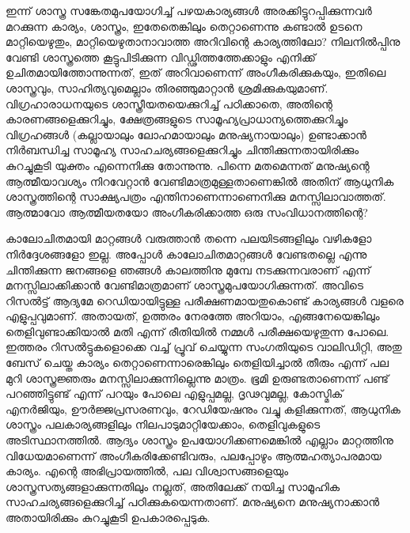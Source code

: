 ഇന്ന് ശാസ്ത്ര സങ്കേതമുപയോഗിച്ച് പഴയകാര്യങ്ങള്‍ അരക്കിട്ടുറപ്പിക്കുന്നവര്‍ മറക്കുന്ന കാര്യം, ശാസ്ത്രം, ഇതേതെങ്കിലും തെറ്റാണെന്നു കണ്ടാല്‍ ഉടനെ മാറ്റിയെഴുതും, മാറ്റിയെഴുതാനാവാത്ത അറിവിന്റെ കാര്യത്തിലോ? നിലനില്‍പ്പിനു വേണ്ടി ശാസ്ത്രത്തെ കൂട്ടുപിടിക്കുന്ന വിഡ്ഢിത്തത്തേക്കാളും എനിക്ക് ഉചിതമായിത്തോന്നുന്നത്, ഇത് അറിവാണെന്ന് അംഗീകരിക്കുകയും, ഇതിലെ ശാസ്ത്രവും, സാഹിത്യവുമെല്ലാം തിരഞ്ഞുമാറ്റാന്‍ ശ്രമിക്കുകയുമാണ്. വിഗ്രഹാരാധനയുടെ ശാസ്ത്രീയതയെക്കുറിച്ച് പഠിക്കാതെ, അതിന്റെ കാരണങ്ങളെക്കുറിച്ചും, ക്ഷേത്രങ്ങളുടെ സാമൂഹ്യപ്രാധാന്യത്തെക്കുറിച്ചും വിഗ്രഹങ്ങള്‍ (കല്ലായാലും ലോഹമായാലും മനുഷ്യനായാലും) ഉണ്ടാക്കാന്‍ നിര്‍ബന്ധിച്ച സാമൂഹ്യ സാഹചര്യങ്ങളെക്കുറിച്ചും ചിന്തിക്കുന്നതായിരിക്കും കുറച്ചുകൂടി യുക്തം എന്നെനിക്കു തോന്നുന്നു. പിന്നെ മതമെന്നത് മനുഷ്യന്റെ ആത്മീയാവശ്യം നിറവേറ്റാന്‍ വേണ്ടിമാത്രമുള്ളതാണെങ്കില്‍ അതിന് ആധുനിക ശാസ്ത്രത്തിന്റെ സാക്ഷ്യപത്രം എന്തിനാണെന്നാണെനിക്കു മനസ്സിലാവാത്തത്. ആത്മാവോ ആത്മീയതയോ അംഗീകരിക്കാത്ത ഒരു സംവിധാനത്തിന്റെ?

കാലോചിതമായി മാറ്റങ്ങള്‍ വരുത്താന്‍ തന്നെ പലയിടങ്ങളിലും വഴികളോ നിര്‍ദ്ദേശങ്ങളോ ഇല്ല. അപ്പോള്‍ കാലോചിതമാറ്റങ്ങള്‍ വേണ്ടതല്ലെ എന്നു ചിന്തിക്കുന്ന ജനങ്ങളെ ഞങ്ങള്‍ കാലത്തിനു മുമ്പേ നടക്കുന്നവരാണ് എന്ന് മനസ്സിലാക്കിക്കാന്‍ വേണ്ടിമാത്രമാണ് ശാസ്ത്രമുപയോഗിക്കുന്നത്. അവിടെ റിസല്‍ട്ട് ആദ്യമേ റെഡിയായിട്ടുള്ള പരീക്ഷണമായതുകൊണ്ട് കാര്യങ്ങള്‍ വളരെ എളുപ്പവുമാണ്. അതായത്, ഉത്തരം നേരത്തേ അറിയാം, എങ്ങനേയെങ്കിലും തെളിവുണ്ടാക്കിയാല്‍ മതി എന്ന് രീതിയില്‍ നമ്മള്‍ പരീക്ഷയെഴുതുന്ന പോലെ. ഇത്തരം റിസല്‍ട്ടുകളൊക്കെ വച്ച് പ്രൂവ് ചെയ്യുന്ന സംഗതിയുടെ വാലിഡിറ്റി, അതു ബേസ് ചെയ്ത കാര്യം തെറ്റാണെന്നാരെങ്കിലും തെളിയിച്ചാല്‍ തീരും എന്ന് പല മുറി ശാസ്ത്രജ്ഞരും മനസ്സിലാക്കുന്നില്ലെന്നു മാത്രം. ഭൂമി ഉരുണ്ടതാണെന്ന് പണ്ട് പറഞ്ഞിട്ടുണ്ട് എന്ന് പറയും പോലെ എളുപ്പമല്ല, ദൃഢവുമല്ല, കോസ്മിക് എനര്‍ജിയും, ഊര്‍ജ്ജപ്രസരണവും, റേഡിയേഷനും വച്ചു കളിക്കുന്നത്, ആധുനിക ശാസ്ത്രം പലകാര്യങ്ങളിലും നിലപാടുമാറ്റിയേക്കാം, തെളിവുകളുടെ അടിസ്ഥാനത്തില്‍. ആദ്യം ശാസ്ത്രം ഉപയോഗിക്കണമെങ്കില്‍ എല്ലാം മാറ്റത്തിനു വിധേയമാണെന്ന് അംഗീകരിക്കേണ്ടിവരും, പലപ്പോഴും ആത്മഹത്യാപരമായ കാര്യം. എന്റെ അഭിപ്രായത്തില്‍, പല വിശ്വാസങ്ങളെയും ശാസ്ത്രസത്യങ്ങളാക്കുന്നതിലും നല്ലത്, അതിലേക്ക് നയിച്ച സാമൂഹിക സാഹചര്യങ്ങളെക്കുറിച്ച് പഠിക്കുകയെന്നതാണ്. മനുഷ്യനെ മനുഷ്യനാക്കാന്‍ അതായിരിക്കും കുറച്ചുകൂടി ഉപകാരപ്പെടുക.

